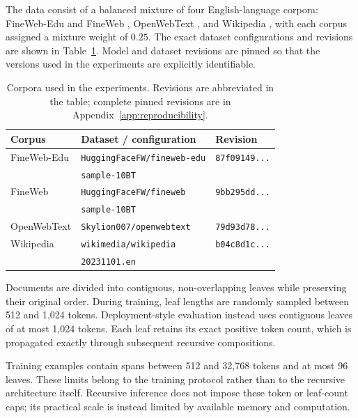 \documentclass[10pt]{article}
\begin{document}
The data consist of a balanced mixture of four English-language corpora:
FineWeb-Edu and FineWeb \citep{penedo-etal-2024-fineweb}, OpenWebText \citep{gokaslan-cohen-2019-openwebtext}, and Wikipedia \citep{wikimedia-2023-wikipedia}, with each corpus assigned a
mixture weight of \(0.25\). The exact dataset configurations and revisions are
shown in Table~\ref{tab:datasets}. Model and dataset revisions are pinned so
that the versions used in the experiments are explicitly identifiable.

\begin{table}[t]
\caption{Corpora used in the experiments. Revisions are abbreviated in the
table; complete pinned revisions are in Appendix~\ref{app:reproducibility}.}
\label{tab:datasets}
\centering
\small
\begin{tabular}{lll}
\hline
\textbf{Corpus} & \textbf{Dataset / configuration} & \textbf{Revision} \\
\hline
FineWeb-Edu &
\texttt{HuggingFaceFW/fineweb-edu} &
\texttt{87f09149...} \\
&
\texttt{sample-10BT} &
\\

FineWeb &
\texttt{HuggingFaceFW/fineweb} &
\texttt{9bb295dd...} \\
&
\texttt{sample-10BT} &
\\

OpenWebText &
\texttt{Skylion007/openwebtext} &
\texttt{79d93d78...} \\

Wikipedia &
\texttt{wikimedia/wikipedia} &
\texttt{b04c8d1c...} \\
&
\texttt{20231101.en} &
\\
\hline
\end{tabular}
\end{table}

Documents are divided into contiguous, non-overlapping leaves while preserving
their original order. During training, leaf lengths are randomly sampled
between 512 and 1,024 tokens. Deployment-style evaluation instead uses
contiguous leaves of at most 1,024 tokens. Each leaf retains its exact positive
token count, which is propagated exactly through subsequent recursive
compositions.

Training examples contain spans between 512 and 32,768 tokens and at most 96
leaves. These limits belong to the training protocol rather than to the
recursive architecture itself. Recursive inference does not impose these token
or leaf-count caps; its practical scale is instead limited by available memory
and computation.
\end{document}
